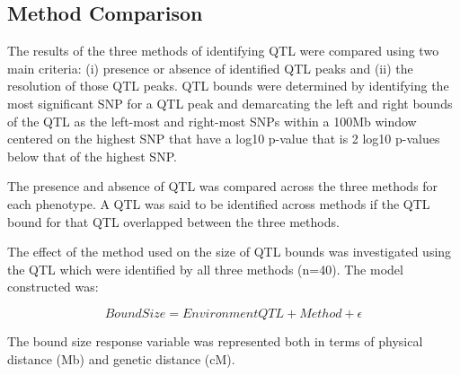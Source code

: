 \documentclass[article,9pt,twocolumn,twoside]{rilabRxiv}
\begin{document}
\subsection{Method Comparison}
The results of the three methods of identifying QTL were compared using two main criteria: (i) presence or absence of identified QTL peaks and (ii) the resolution of those QTL peaks. %
QTL bounds were determined by identifying the most significant SNP for a QTL peak and demarcating the left and right bounds of the QTL as the left-most and right-most SNPs within a 100Mb window centered on the highest SNP that have a log10 p-value that is 2 log10 p-values below that of the highest SNP.

The presence and absence of QTL was compared across the three methods for each phenotype. A QTL was said to be identified across methods if the QTL bound for that QTL overlapped between the three methods.

The effect of the method used on the size of QTL bounds was investigated using the QTL which were identified by all three methods (n=40). The model constructed was:

\begin{equation}
\label{eqn:bounds}
 Bound Size = Environment QTL + Method + \epsilon
\end{equation}

The bound size response variable was represented both in terms of physical distance (Mb) and genetic distance (cM).
\end{document}
